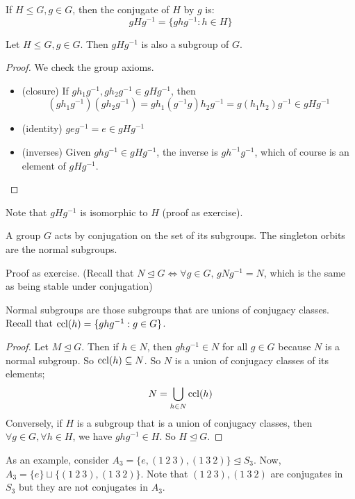 \begin{definition}
	If \(H \leq G, g \in G\), then the conjugate of \(H\) by \(g\) is:
	\[
		gHg^{-1} = \{ ghg^{-1} : h \in H \}
	\]
\end{definition}
\begin{proposition}
	Let \(H \leq G, g \in G\).
	Then \(gHg^{-1}\) is also a subgroup of \(G\).
\end{proposition}
\begin{proof}
	We check the group axioms.
	\begin{itemize}
		\item (closure) If \(gh_1g^{-1}, gh_2g^{-1} \in gHg^{-1}\), then
		      \[
			      (gh_1g^{-1})(gh_2g^{-1}) = gh_1(g^{-1}g)h_2g^{-1} = g(h_1h_2)g^{-1} \in gHg^{-1}
		      \]
		\item (identity) \(geg^{-1} = e \in gHg^{-1}\)
		\item (inverses) Given \(ghg^{-1} \in gHg^{-1}\), the inverse is \(gh^{-1}g^{-1}\), which of course is an element of \(gHg^{-1}\).
	\end{itemize}
\end{proof}
Note that \(gHg^{-1}\) is isomorphic to \(H\) (proof as exercise).
\begin{proposition}
	A group \(G\) acts by conjugation on the set of its subgroups.
	The singleton orbits are the normal subgroups.
\end{proposition}
Proof as exercise.
(Recall that \(N \trianglelefteq G \iff \forall g \in G,\, gNg^{-1} = N\), which is the same as being stable under conjugation)
\begin{proposition}
	Normal subgroups are those subgroups that are unions of conjugacy classes.
	Recall that \(\operatorname{ccl}(h) = \{ ghg^{-1} : g \in G \}\).
\end{proposition}
\begin{proof}
	Let \(M \trianglelefteq G\).
	Then if \(h \in N\), then \(ghg^{-1} \in N\) for all \(g \in G\) because \(N\) is a normal subgroup.
	So \(\operatorname{ccl}(h) \subseteq N\).
	So \(N\) is a union of conjugacy classes of its elements;
	\[
		N = \bigcup_{h \in N} \operatorname{ccl}(h)
	\]
	Conversely, if \(H\) is a subgroup that is a union of conjugacy classes, then \(\forall g \in G, \forall h \in H\), we have \(ghg^{-1} \in H\).
	So \(H \trianglelefteq G\).
\end{proof}
As an example, consider \(A_3 = \{ e, (1\ 2\ 3), (1\ 3\ 2) \} \trianglelefteq S_3\).
Now, \(A_3 = \{ e \} \sqcup \{ (1\ 2\ 3), (1\ 3\ 2) \}\).
Note that \((1\ 2\ 3), (1\ 3\ 2)\) are conjugates in \(S_3\) but they are not conjugates in \(A_3\).

